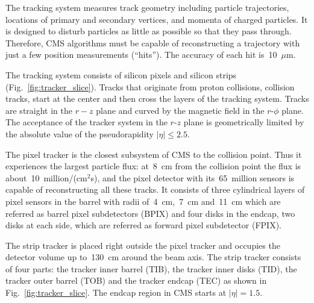 The tracking system measures track geometry including particle trajectories, locations of primary and secondary vertices, and momenta of charged particles. It is designed to disturb particles as little as possible so that they pass through. Therefore, CMS algorithms must be capable of reconstructing a trajectory with just a few position measurements (``hits''). The accuracy of each hit is~10~$\mu$m.

The tracking system consists of silicon pixels and silicon strips (Fig.~\ref{fig:tracker_slice}). Tracks that originate from proton collisions, collision tracks, start at the center and then cross the layers of the tracking system. Tracks are straight in the $r-z$ plane and curved by the magnetic field in the $r$-$\phi$ plane. The acceptance of the tracker system in the $r$-$z$ plane is geometrically limited by the absolute value of the pseudorapidity $|\eta| \leq 2.5$.

The pixel tracker is the closest subsystem of CMS to the collision point. Thus it experiences the largest particle flux: at~8~cm from the collision point the flux is about~10~million/(cm$^2$s), and the pixel detector with its~65~million sensors is capable of reconstructing all these tracks. It consists of three cylindrical layers of pixel sensors in the barrel with radii of~4~cm,~7~cm and~11~cm which are referred as barrel pixel subdetectors (BPIX) and four disks in the endcap, two disks at each side, which are referred as forward pixel subdetector (FPIX). 


The strip tracker is placed right outside the pixel tracker and occupies the detector volume up to~130~cm around the beam axis. The strip tracker consists of four parts: the tracker inner barrel (TIB), the tracker inner disks (TID), the tracker outer barrel (TOB) and the tracker endcap (TEC) as shown in Fig.~\ref{fig:tracker_slice}. The endcap region in CMS starts at $|\eta|=1.5$. %



